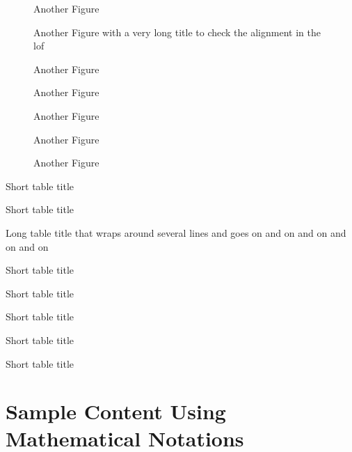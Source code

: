 \documentclass[msc,oneside]{ubcthesis}%
\begin{document}
\begin{figure}%
\caption{Another Figure}%
\end{figure}

\begin{figure}%
\caption{Another Figure with a very long title to check the alignment in the lof}%
\end{figure}

\begin{figure}%
\caption{Another Figure}%
\end{figure}

\begin{figure}%
\caption{Another Figure}%
\end{figure}

\begin{figure}%
\caption{Another Figure}%
\end{figure}

\begin{figure}%
\caption{Another Figure}%
\end{figure}

\begin{figure}%
\caption{Another Figure}%
\end{figure}

\begin{table}
\caption{Short table title}
\end{table}
\begin{table}
\caption{Short table title}
\end{table}
\begin{table}
\caption{Long table title that wraps around several lines and goes on and on and on and on and on}
\end{table}
\begin{table}
\caption{Short table title}
\end{table}
\begin{table}
\caption{Short table title}
\end{table}
\begin{table}
\caption{Short table title}
\end{table}
\begin{table}
\caption{Short table title}
\end{table}
\begin{table}
\caption{Short table title}
\end{table}


\chapter{Sample Content Using Mathematical Notations}
\end{document}

